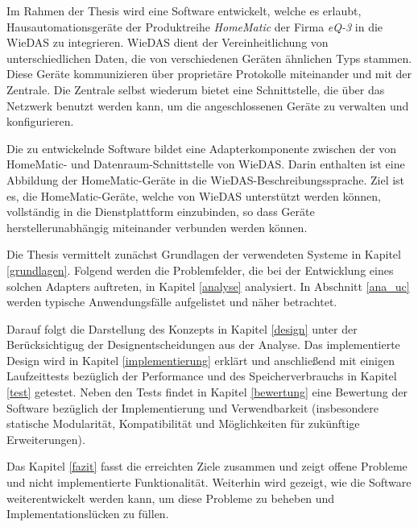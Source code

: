 Im Rahmen der Thesis wird eine Software entwickelt, welche es erlaubt, Hausautomationsgeräte der Produktreihe
\emph{HomeMatic} der Firma \emph{eQ-3} in die WieDAS zu integrieren.
WieDAS dient der Vereinheitlichung von unterschiedlichen Daten, die von verschiedenen Geräten ähnlichen
Typs stammen.
Diese Geräte kommunizieren über proprietäre Protokolle miteinander und mit der Zentrale.
Die Zentrale selbst wiederum bietet eine Schnittstelle, die über das Netzwerk benutzt werden kann, um die
angeschlossenen Geräte zu verwalten und konfigurieren.

Die zu entwickelnde Software bildet eine Adapterkomponente zwischen der von HomeMatic- und Datenraum-Schnittstelle von
WieDAS.
Darin enthalten ist eine Abbildung der HomeMatic-Geräte in die WieDAS-Beschreibungssprache.
Ziel ist es, die HomeMatic-Geräte, welche von WieDAS unterstützt werden können, vollständig in die
Dienstplattform einzubinden, so dass Geräte herstellerunabhängig miteinander verbunden werden können.

Die Thesis vermittelt zunächst Grundlagen der verwendeten Systeme in Kapitel \ref{grundlagen}.
Folgend werden die Problemfelder, die bei der Entwicklung eines solchen Adapters auftreten, in
Kapitel \ref{analyse} analysiert.
In Abschnitt \ref{ana_uc} werden typische Anwendungsfälle aufgelistet und näher betrachtet.

Darauf folgt die Darstellung des Konzepts in Kapitel \ref{design} unter der Berücksichtigug der
Designentscheidungen aus der Analyse.
Das implementierte Design wird in Kapitel \ref{implementierung} erklärt und anschließend mit
einigen Laufzeittests bezüglich der Performance und des Speicherverbrauchs in Kapitel \ref{test}
getestet.
Neben den Tests findet in Kapitel \ref{bewertung} eine Bewertung der Software bezüglich
der Implementierung und Verwendbarkeit (insbesondere statische
Modularität, Kompatibilität und Möglichkeiten für zukünftige Erweiterungen).

Das Kapitel \ref{fazit} fasst die erreichten Ziele zusammen und zeigt
offene Probleme und nicht implementierte Funktionalität.
Weiterhin wird gezeigt, wie die Software weiterentwickelt werden kann, um diese Probleme
zu beheben und Implementationslücken zu füllen.
